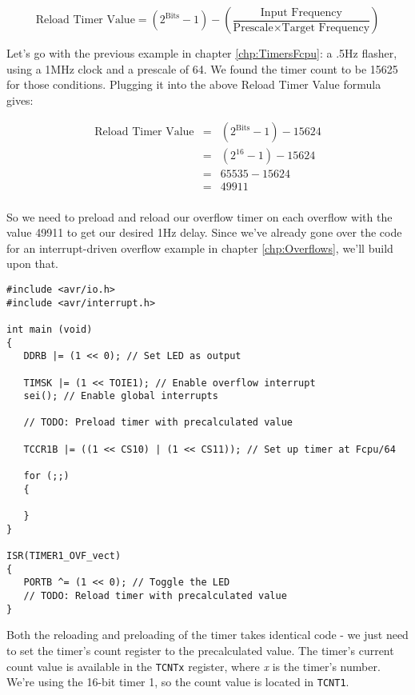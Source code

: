 \documentclass[a4paper,oneside,notitlepage]{book}
\begin{document}
\begin{displaymath}
\text{Reload Timer Value} = (2^\text{Bits} - 1) - (\frac{\text{Input Frequency}}{\text{Prescale} \times \text{Target Frequency}})
\end{displaymath}

Let's go with the previous example in chapter \ref{chp:TimersFcpu}: a .5Hz flasher, using a 1MHz clock and a prescale of 64. We found the timer count to be 15625 for those conditions. Plugging it into the above Reload Timer Value formula gives:

\begin{displaymath}
\begin{array}{rcl}
\text{Reload Timer Value} & = & (2^\text{Bits} - 1) - 15624 \\
                          & = & (2^{16} - 1) - 15624 \\
                          & = & 65535 - 15624 \\
                          & = & 49911 \\
\end{array}
\end{displaymath}

So we need to preload and reload our overflow timer on each overflow with the value 49911 to get our desired 1Hz delay. Since we've already gone over the code for an interrupt-driven overflow example in chapter \ref{chp:Overflows}, we'll build upon that.

\begin{center}
\begin{lstlisting}
#include <avr/io.h>
#include <avr/interrupt.h>

int main (void)
{
   DDRB |= (1 << 0); // Set LED as output

   TIMSK |= (1 << TOIE1); // Enable overflow interrupt
   sei(); // Enable global interrupts

   // TODO: Preload timer with precalculated value

   TCCR1B |= ((1 << CS10) | (1 << CS11)); // Set up timer at Fcpu/64

   for (;;)
   {

   }
}

ISR(TIMER1_OVF_vect)
{
   PORTB ^= (1 << 0); // Toggle the LED
   // TODO: Reload timer with precalculated value
}
\end{lstlisting}
\end{center}

Both the reloading and preloading of the timer takes identical code - we just need to set the timer's count register to the precalculated value. The timer's current count value is available in the \texttt{TCNTx} register, where \textit{x} is the timer's number. We're using the 16-bit timer 1, so the count value is located in \texttt{TCNT1}.
\end{document}

